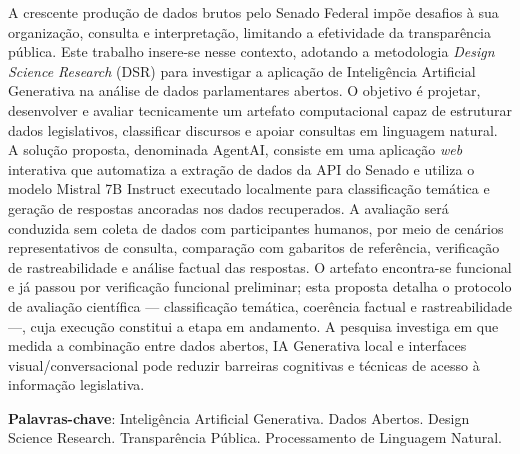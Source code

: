 \documentclass[
    12pt,
    oneside,
    a4paper,
    english,
    brazil,
    sumario=tradicional,
    msc
]{dcomp-abntex2}
\begin{document}
\imprimircapa
\imprimirfolhaderosto*


\begin{resumo}
A crescente produção de dados brutos pelo Senado Federal impõe desafios à sua organização, consulta e interpretação, limitando a efetividade da transparência pública. Este trabalho insere-se nesse contexto, adotando a metodologia \textit{Design Science Research} (DSR) para investigar a aplicação de Inteligência Artificial Generativa na análise de dados parlamentares abertos. O objetivo é projetar, desenvolver e avaliar tecnicamente um artefato computacional capaz de estruturar dados legislativos, classificar discursos e apoiar consultas em linguagem natural. A solução proposta, denominada AgentAI, consiste em uma aplicação \textit{web} interativa que automatiza a extração de dados da API do Senado e utiliza o modelo Mistral 7B Instruct executado localmente para classificação temática e geração de respostas ancoradas nos dados recuperados. A avaliação será conduzida sem coleta de dados com participantes humanos, por meio de cenários representativos de consulta, comparação com gabaritos de referência, verificação de rastreabilidade e análise factual das respostas. O artefato encontra-se funcional e já passou por verificação funcional preliminar; esta proposta detalha o protocolo de avaliação científica --- classificação temática, coerência factual e rastreabilidade ---, cuja execução constitui a etapa em andamento. A pesquisa investiga em que medida a combinação entre dados abertos, IA Generativa local e interfaces visual/conversacional pode reduzir barreiras cognitivas e técnicas de acesso à informação legislativa.

\textbf{Palavras-chave}: Inteligência Artificial Generativa. Dados Abertos. Design Science Research. Transparência Pública. Processamento de Linguagem Natural.
\end{resumo}
\end{document}
